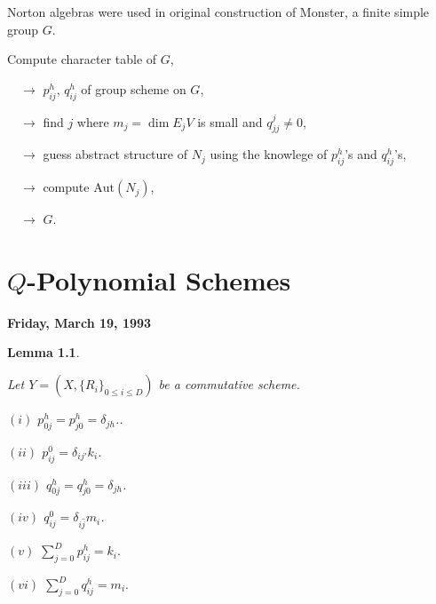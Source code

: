 \documentclass[
]{book}
\newtheorem{lemma}{Lemma}[chapter]
\theoremstyle{definition}
\theoremstyle{definition}
\theoremstyle{definition}
\theoremstyle{definition}
\theoremstyle{remark}
\begin{document}
Norton algebras were used in original construction of Monster, a finite simple group \(G\).

Compute character table of \(G\),

\(\quad\to\) \(p^h_{ij}\), \(q^h_{ij}\) of group scheme on \(G\),

\(\quad\to\) find \(j\) where \(m_j = \dim E_jV\) is small and \(q^j_{jj}\neq 0\),

\(\quad\to\) guess abstract structure of \(N_j\) using the knowlege of \(p^h_{ij}\)'s and \(q^h_{ij}\)'s,

\(\quad\to\) compute \(\mathrm{Aut}(N_j)\),

\(\quad\to\) \(G\).

\hypertarget{lec22}{%
\chapter{\texorpdfstring{\(Q\)-Polynomial Schemes}{Q-Polynomial Schemes}}\label{lec22}}

\textbf{Friday, March 19, 1993}

\begin{lemma}
\protect\hypertarget{lem:phijqhij2}{}\label{lem:phijqhij2}

Let \(Y = (X, \{R_i\}_{0\leq i\leq D})\) be a commutative scheme.

\((i)\) \(p^h_{0j} = p^h_{j0} = \delta_{jh}\)..

\((ii)\) \(p^0_{ij} = \delta_{ij'}k_i\).

\((iii)\) \(q^h_{0j} = q^h_{j0} = \delta_{jh}\).

\((iv)\) \(q^0_{ij} = \delta_{i\hat{j}}m_i\).

\((v)\) \({\displaystyle \sum_{j=0}^D p^h_{ij} = k_i}.\)

\((vi)\) \({\displaystyle \sum_{j=0}^D q^h_{ij} = m_i}.\)

\end{lemma}
\end{document}
